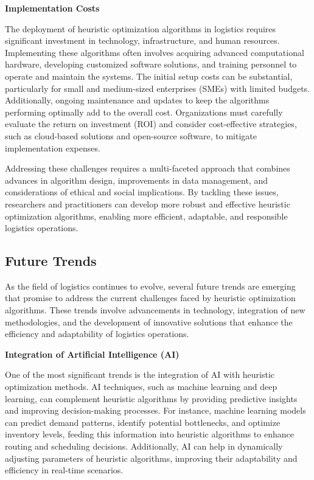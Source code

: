 \documentclass[
]{article}
\begin{document}
\textbf{Implementation Costs}

The deployment of heuristic optimization algorithms in logistics requires significant investment in technology, infrastructure, and human resources. Implementing these algorithms often involves acquiring advanced computational hardware, developing customized software solutions, and training personnel to operate and maintain the systems. The initial setup costs can be substantial, particularly for small and medium-sized enterprises (SMEs) with limited budgets. Additionally, ongoing maintenance and updates to keep the algorithms performing optimally add to the overall cost. Organizations must carefully evaluate the return on investment (ROI) and consider cost-effective strategies, such as cloud-based solutions and open-source software, to mitigate implementation expenses.

Addressing these challenges requires a multi-faceted approach that combines advances in algorithm design, improvements in data management, and considerations of ethical and social implications. By tackling these issues, researchers and practitioners can develop more robust and effective heuristic optimization algorithms, enabling more efficient, adaptable, and responsible logistics operations.


\subsection{Future Trends}

As the field of logistics continues to evolve, several future trends are emerging that promise to address the current challenges faced by heuristic optimization algorithms. These trends involve advancements in technology, integration of new methodologies, and the development of innovative solutions that enhance the efficiency and adaptability of logistics operations.

\textbf{Integration of Artificial Intelligence (AI)}

One of the most significant trends is the integration of AI with heuristic optimization methods. AI techniques, such as machine learning and deep learning, can complement heuristic algorithms by providing predictive insights and improving decision-making processes. For instance, machine learning models can predict demand patterns, identify potential bottlenecks, and optimize inventory levels, feeding this information into heuristic algorithms to enhance routing and scheduling decisions. Additionally, AI can help in dynamically adjusting parameters of heuristic algorithms, improving their adaptability and efficiency in real-time scenarios.
\end{document}
